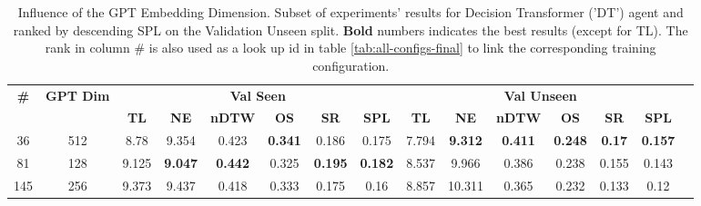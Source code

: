 \begin{table}
\centering
\caption{\label{tab:dt_dim_test}Influence of the GPT Embedding Dimension. Subset of experiments' results for Decision Transformer ('DT') agent and ranked by descending SPL on the Validation Unseen split. \textbf{Bold} numbers indicates the best results (except for TL). The rank in column \# is also used as a look up id in table \ref{tab:all-configs-final} to link the corresponding training configuration.}
\begin{tabular}{@{\hskip3pt}c@{\hskip3pt}c@{\hskip3pt}c@{\hskip3pt}c@{\hskip3pt}c@{\hskip3pt}c@{\hskip3pt}c@{\hskip3pt}c@{\hskip3pt}c@{\hskip3pt}c@{\hskip3pt}c@{\hskip3pt}c@{\hskip3pt}c@{\hskip3pt}c@{\hskip3pt}c}
\toprule
                                  \textbf{\#} & \textbf{GPT Dim} & \multicolumn{6}{c}{\textbf{Val Seen}} & \multicolumn{6}{c}{\textbf{Val Unseen}} \\
\cmidrule(l){3-8}\cmidrule(l){9-14}\textbf{~} &       \textbf{~} &       \textbf{TL} &     \textbf{NE} &   \textbf{nDTW} &     \textbf{OS} &     \textbf{SR} &    \textbf{SPL} &         \textbf{TL} &     \textbf{NE} &   \textbf{nDTW} &     \textbf{OS} &    \textbf{SR} &    \textbf{SPL} \\
\midrule
                                           36 &              512 &              8.78 &           9.354 &           0.423 &  \textbf{0.341} &           0.186 &           0.175 &               7.794 &  \textbf{9.312} &  \textbf{0.411} &  \textbf{0.248} &  \textbf{0.17} &  \textbf{0.157} \\
                                           81 &              128 &             9.125 &  \textbf{9.047} &  \textbf{0.442} &           0.325 &  \textbf{0.195} &  \textbf{0.182} &               8.537 &           9.966 &           0.386 &           0.238 &          0.155 &           0.143 \\
                                          145 &              256 &             9.373 &           9.437 &           0.418 &           0.333 &           0.175 &            0.16 &               8.857 &          10.311 &           0.365 &           0.232 &          0.133 &            0.12 \\
\bottomrule
\end{tabular}
\end{table}
